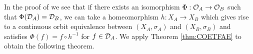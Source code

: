 \documentclass[11pt]{article}
\theoremstyle{plain}
\theoremstyle{definition}
\numberwithin{equation}{section}
\newcommand{\Ad}{\operatorname{Ad}}
\newcommand{\RZ}{\mathbb{R}/{\mathbb{Z}}}
\newcommand{\Z}{\mathbb{Z}}
\begin{document}
%
In the proof of \cite[Theorem 5.7]{MaPacific}
we see  that if there exists an isomorphism
$\Phi:{{\mathcal{O}}_A} \rightarrow {{\mathcal{O}}_B}$   
such that $\Phi({{\mathcal{D}}_A}) = {{\mathcal{D}}_B}$,
we can take a homeomorphism
$h:X_A\rightarrow X_B$ which gives rise to a continuous orbit equivalence
between $(X_A,\sigma_A)$ and 
$(X_B,\sigma_B)$
and satisfies
$\Phi(f) = f \circ h^{-1}$
for $f \in {{\mathcal{D}}_A}$.
We apply Theorem \ref{thm:COETFAE} to 
obtain the following theorem.
\end{document}
